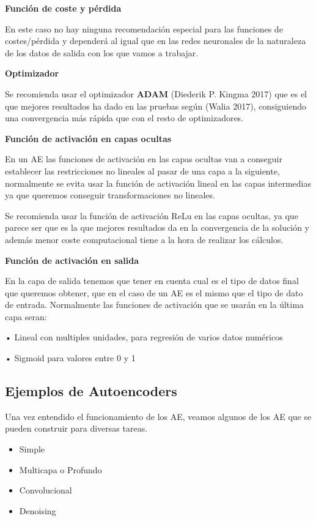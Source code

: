 \documentclass[
  a4paper,
  DIV=11,
  numbers=noendperiod]{scrreprt}
\begin{document}
\textbf{Función de coste y pérdida}

En este caso no hay ninguna recomendación especial para las funciones de
costes/pérdida y dependerá al igual que en las redes neuronales de la
naturaleza de los datos de salida con los que vamos a trabajar.

\textbf{Optimizador}

Se recomienda usar el optimizador \textbf{ADAM} (Diederik P. Kingma
2017) que es el que mejores resultados ha dado en las pruebas según
(Walia 2017), consiguiendo una convergencia más rápida que con el resto
de optimizadores.

\textbf{Función de activación en capas ocultas}

En un AE las funciones de activación en las capas ocultas van a
conseguir establecer las restricciones no lineales al pasar de una capa
a la siguiente, normalmente se evita usar la función de activación
lineal en las capas intermedias ya que queremos conseguir
transformaciones no lineales.

Se recomienda usar la función de activación ReLu en las capas ocultas,
ya que parece ser que es la que mejores resultados da en la convergencia
de la solución y además menor coste computacional tiene a la hora de
realizar los cálculos.

\textbf{Función de activación en salida}

En la capa de salida tenemos que tener en cuenta cual es el tipo de
datos final que queremos obtener, que en el caso de un AE es el mismo
que el tipo de dato de entrada. Normalmente las funciones de activación
que se usarán en la última capa seran:

• Lineal con multiples unidades, para regresión de varios datos
numéricos

• Sigmoid para valores entre 0 y 1

\subsection{Ejemplos de Autoencoders}\label{ejemplos-de-autoencoders}

Una vez entendido el funcionamiento de los AE, veamos algunos de los AE
que se pueden construir para diversas tareas.

\begin{itemize}
\item
  Simple
\item
  Multicapa o Profundo
\item
  Convolucional
\item
  Denoising
\end{itemize}
\end{document}
